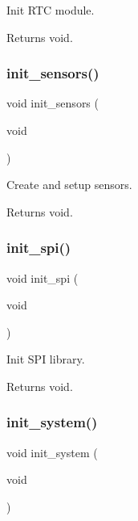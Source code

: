 Init R\+TC module. 

\begin{DoxyReturn}{Returns}
void. 
\end{DoxyReturn}
\mbox{\label{i2c-rain_8ino_ac74850003fab6eb3269bfe043d0f939c}} 
\subsubsection{\texorpdfstring{init\+\_\+sensors()}{init\_sensors()}}
{\footnotesize\ttfamily void init\+\_\+sensors (\begin{DoxyParamCaption}\item[{void}]{ }\end{DoxyParamCaption})}



Create and setup sensors. 

\begin{DoxyReturn}{Returns}
void. 
\end{DoxyReturn}
\mbox{\label{i2c-rain_8ino_a8eb9780a3438ec02c70314744f91f3c7}} 
\subsubsection{\texorpdfstring{init\+\_\+spi()}{init\_spi()}}
{\footnotesize\ttfamily void init\+\_\+spi (\begin{DoxyParamCaption}\item[{void}]{ }\end{DoxyParamCaption})}



Init S\+PI library. 

\begin{DoxyReturn}{Returns}
void. 
\end{DoxyReturn}
\mbox{\label{i2c-rain_8ino_afceb890a6ab9be73cc5481369538c705}} 
\subsubsection{\texorpdfstring{init\+\_\+system()}{init\_system()}}
{\footnotesize\ttfamily void init\+\_\+system (\begin{DoxyParamCaption}\item[{void}]{ }\end{DoxyParamCaption})}



